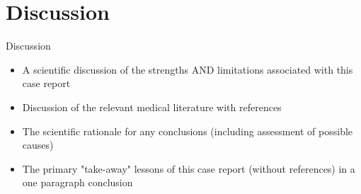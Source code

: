 \section{Discussion}
\begin{frame}{Discussion}
    \begin{itemize}
    \item A scientific discussion of the strengths AND limitations associated with this case report
    \item Discussion of the relevant medical literature with references
    \item The scientific rationale for any conclusions (including assessment of possible causes)
    \item The primary "take-away" lessons of this case report (without references) in a one paragraph conclusion
    
    
    \end{itemize}
\end{frame}
